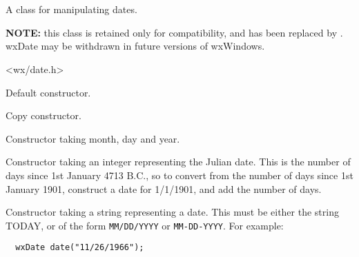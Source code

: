 \section{}\label{wxdate}

A class for manipulating dates.

{\bf NOTE:} this class is retained only for compatibility,
and has been replaced by . wxDate
may be withdrawn in future versions of wxWindows.




<wx/date.h>




\label{wxdateconstr}


Default constructor.


Copy constructor.


Constructor taking month, day and year.


Constructor taking an integer representing the Julian date. This is the number of days since
1st January 4713 B.C., so to convert from the number of days since 1st January 1901,
construct a date for 1/1/1901, and add the number of days.


Constructor taking a string representing a date. This must be either the string TODAY, or of the
form {\tt MM/DD/YYYY} or {\tt MM-DD-YYYY}. For example:

\begin{verbatim}
  wxDate date("11/26/1966");
\end{verbatim}




